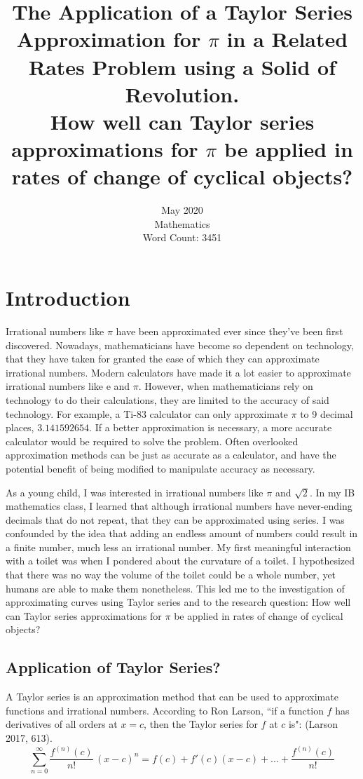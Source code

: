 \documentclass[12pt, titlepage]{article}
\date{\normalsize May 2020 \\ Mathematics \\ Word Count: 3451}
\title{\normalsize The Application of a Taylor Series Approximation for \(\pi\) in a Related Rates Problem using a Solid of Revolution. \bigskip \\  How well can Taylor series approximations for \(\pi\) be applied in rates of change of cyclical objects?}
\begin{document}
\maketitle
\tableofcontents
\newpage

\section{Introduction}
Irrational numbers like \(\pi\) have been approximated ever since they've been first discovered. Nowadays, mathematicians have become so dependent on technology, that they have taken for granted the ease of which they can approximate irrational numbers. Modern calculators have made it a lot easier to approximate irrational numbers like e and \(\pi\). However, when mathematicians rely on technology to do their calculations, they are limited to the accuracy of said technology. For example, a Ti-83 calculator can only approximate \(\pi\) to 9 decimal places, \(3.141592654\). If a better approximation is necessary, a more accurate calculator would be required to solve the problem. Often overlooked approximation methods can be just as accurate as a calculator, and have the potential benefit of being modified to manipulate accuracy as necessary.

As a young child, I was interested in irrational numbers like \(\pi\) and \(\sqrt{2}\). In my IB mathematics class, I learned that although irrational numbers have never-ending decimals that do not repeat, that they can be approximated using series. I was confounded by the idea that adding an endless amount of numbers could result in a finite number, much less an irrational number. My first meaningful interaction with a toilet was when I pondered about the curvature of a toilet. I hypothesized that there was no way the volume of the toilet could be a whole number, yet humans are able to make them nonetheless. This led me to the investigation of approximating curves using Taylor series and to the research question: How well can Taylor series approximations for \(\pi\) be applied in rates of change of cyclical objects?

\subsection{Application of Taylor Series?}
A Taylor series is an approximation method that can be used to approximate functions and irrational numbers. According to Ron Larson, ``if a function \(f\) has derivatives of all orders at \(x = c\), then the Taylor series for \(f\) at \(c\) is": (Larson 2017, 613).
\begin{equation*}
  \sum_{n=0}^{\infty} \frac{f^{(n)}(c)}{n!} \, (x-c)^{n} = f(c) + f'(c)(x-c) + ... +  \frac{f^{(n)}(c)}{n!}
\end{equation*}
\end{document}
